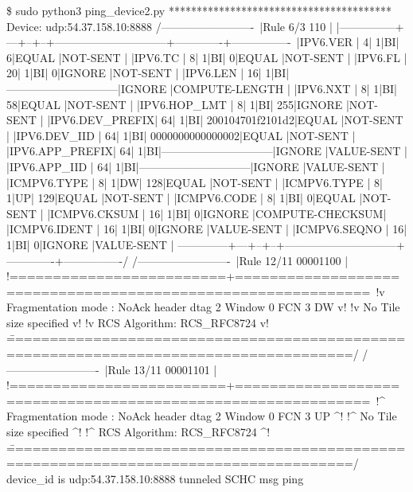 \begin{termc}[backgroundcolor=\color{gray!10}, basicstyle=\ttfamily\tiny]
\$ sudo python3 ping_device2.py 
****************************************
Device: udp:54.37.158.10:8888
/-------------------------\
|Rule 6/3            110  |
|---------------+---+--+--+------------------------------+-------------+----------------\
|IPV6.VER       |  4| 1|BI|                             6|EQUAL        |NOT-SENT        |
|IPV6.TC        |  8| 1|BI|                             0|EQUAL        |NOT-SENT        |
|IPV6.FL        | 20| 1|BI|                             0|IGNORE       |NOT-SENT        |
|IPV6.LEN       | 16| 1|BI|------------------------------|IGNORE       |COMPUTE-LENGTH  |
|IPV6.NXT       |  8| 1|BI|                            58|EQUAL        |NOT-SENT        |
|IPV6.HOP_LMT   |  8| 1|BI|                           255|IGNORE       |NOT-SENT        |
|IPV6.DEV_PREFIX| 64| 1|BI|              200104701f2101d2|EQUAL        |NOT-SENT        |
|IPV6.DEV_IID   | 64| 1|BI|              0000000000000002|EQUAL        |NOT-SENT        |
|IPV6.APP_PREFIX| 64| 1|BI|------------------------------|IGNORE       |VALUE-SENT      |
|IPV6.APP_IID   | 64| 1|BI|------------------------------|IGNORE       |VALUE-SENT      |
|ICMPV6.TYPE    |  8| 1|DW|                           128|EQUAL        |NOT-SENT        |
|ICMPV6.TYPE    |  8| 1|UP|                           129|EQUAL        |NOT-SENT        |
|ICMPV6.CODE    |  8| 1|BI|                             0|EQUAL        |NOT-SENT        |
|ICMPV6.CKSUM   | 16| 1|BI|                             0|IGNORE       |COMPUTE-CHECKSUM|
|ICMPV6.IDENT   | 16| 1|BI|                             0|IGNORE       |VALUE-SENT      |
|ICMPV6.SEQNO   | 16| 1|BI|                             0|IGNORE       |VALUE-SENT      |
\---------------+---+--+--+------------------------------+-------------+----------------/
/-------------------------\
|Rule 12/11     00001100  |
!=========================+=============================================================\
!v Fragmentation mode : NoAck    header dtag 2 Window  0 FCN  3                     DW v!
!v No Tile size specified                                                              v!
!v RCS Algorithm: RCS_RFC8724                                                          v!
\=======================================================================================/
/-------------------------\
|Rule 13/11     00001101  |
!=========================+=============================================================\
!^ Fragmentation mode : NoAck    header dtag 2 Window  0 FCN  3                     UP ^!
!^ No Tile size specified                                                              ^!
!^ RCS Algorithm: RCS_RFC8724                                                          ^!
\=======================================================================================/
device_id is udp:54.37.158.10:8888
tunneled SCHC msg
ping
\end{termc}